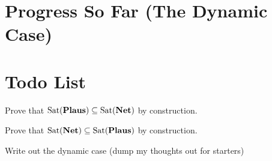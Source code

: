 \documentclass[letterpaper]{article}
\begin{document}

\section*{Progress So Far (The Dynamic Case)}

\section*{Todo List}
\begin{todolist}
    \item Prove that $\mathrm{Sat}( \textrm{\textbf{Plaus}} ) \subseteq \mathrm{Sat}( \textrm{\textbf{Net}} )$ by construction.
    \item Prove that $\mathrm{Sat}( \textrm{\textbf{Net}} ) \subseteq \mathrm{Sat}( \textrm{\textbf{Plaus}} )$ by construction.
    \item Write out the dynamic case (dump my thoughts out for starters)
\end{todolist}





\printbibliography
\end{document}
